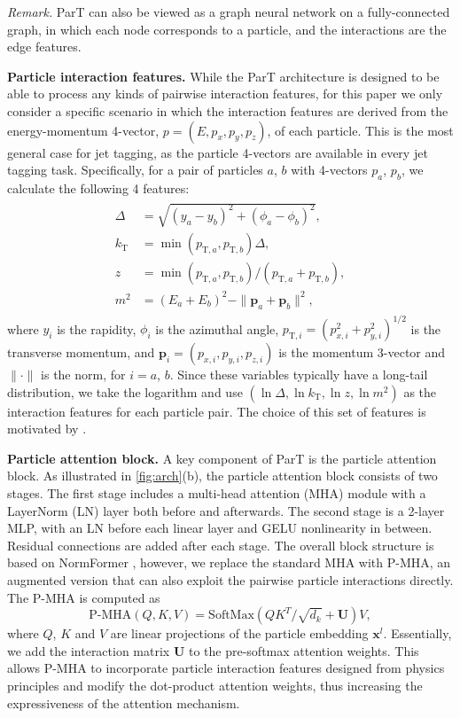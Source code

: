 \documentclass[nohyperref]{article}
\theoremstyle{plain}
\theoremstyle{definition}
\theoremstyle{remark}
\begin{document}
\textit{Remark.} ParT can also be viewed as a graph neural network on a fully-connected graph, in which each node corresponds to a particle, and the interactions are the edge features.

\textbf{Particle interaction features.} While the ParT architecture is designed to be able to process any kinds of pairwise interaction features, for this paper we only consider a specific scenario in which the interaction features are derived from the energy-momentum 4-vector, $p=(E, p_x, p_y, p_z)$, of each particle. This is the most general case for jet tagging, as the particle 4-vectors are available in every jet tagging task. Specifically, for a pair of particles $a$, $b$ with 4-vectors $p_{a}$, $p_{b}$, we calculate the following 4 features:
\begin{align}
\begin{split}
    \Delta &= \sqrt{(y_a - y_b)^2 + (\phi_a - \phi_b)^2}, \\
    k_{\text{T}} &= \min(p_{\text{T},a}, p_{\text{T},b}) \Delta, \\
    z &= \min(p_{\text{T},a}, p_{\text{T},b}) / (p_{\text{T},a} + p_{\text{T},b}), \\
    m^2 &= (E_a+E_b)^2 - \|\mathbf{p}_{a}+\mathbf{p}_{b}\|^2,
\label{eq:interaction}
\end{split}
\end{align}
where $y_i$ is the rapidity, $\phi_i$ is the azimuthal angle, $p_{\text{T},i} = (p_{x, i}^2+p_{y, i}^2)^{1/2}$ is the transverse momentum, and $\mathbf{p}_i=(p_{x,i}, p_{y,i}, p_{z,i})$ is the momentum 3-vector and $\|\cdot\|$ is the norm, for $i=a$, $b$. Since these variables typically have a long-tail distribution, we take the logarithm and use $(\ln \Delta, \ln k_{\text{T}}, \ln z, \ln m^2)$ as the interaction features for each particle pair. The choice of this set of features is  motivated by \citet{Dreyer:2020brq}.

\textbf{Particle attention block.} A key component of ParT is the particle attention block. As illustrated in \cref{fig:arch}(b), the particle attention block consists of two stages. The first stage includes a multi-head attention (MHA) module with a LayerNorm (LN) layer both before and afterwards. The second stage is a 2-layer MLP, with an LN before each linear layer and GELU nonlinearity in between. Residual connections are added after each stage. The overall block structure is based on NormFormer \cite{shleifer2021normformer}, however, we replace the standard MHA with P-MHA, an augmented version that can also exploit the pairwise particle interactions directly. The P-MHA is computed as 
\begin{equation}
    \text{P-MHA}(Q, K, V) = \text{SoftMax}(QK^T / \sqrt{d_k} + \mathbf{U}) V,
\end{equation}
where $Q$, $K$ and $V$ are linear projections of the particle embedding $\mathbf{x}^{l}$. Essentially, we add the interaction matrix $\mathbf{U}$ to the pre-softmax attention weights. This allows P-MHA to incorporate particle interaction features designed from physics principles and modify the dot-product attention weights, thus increasing the expressiveness of the attention mechanism.
\end{document}
